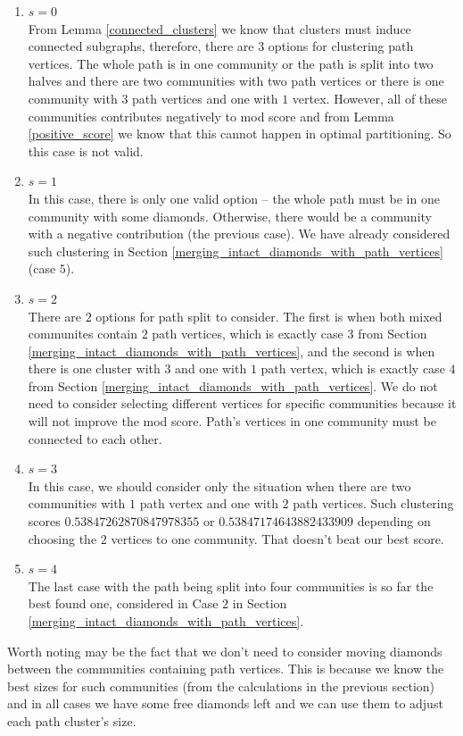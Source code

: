 \documentclass[letterpaper,12pt]{article}
\begin{document}
\begin{enumerate}
      \item $s=0$\\
            From Lemma \ref{connected_clusters} we know that clusters must induce connected subgraphs, therefore, there are $3$ options for clustering path vertices. The whole path is in one community or the path is split into two halves and there are two communities with two path vertices or there is one community with $3$ path vertices and one with $1$ vertex. However, all of these communities contributes negatively to mod score and from Lemma \ref{positive_score} we know that this cannot happen in optimal partitioning. So this case is not valid.\\
      \item $s=1$\\
            In this case, there is only one valid option -- the whole path must be in one community with some diamonds. Otherwise, there would be a community with a negative contribution (the previous case). We have already considered such clustering in Section \ref{merging_intact_diamonds_with_path_vertices} (case $5$).\\
      \item $s=2$\\
            There are $2$ options for path split to consider. The first is when both mixed communites contain $2$ path vertices, which is exactly case $3$ from Section \ref{merging_intact_diamonds_with_path_vertices}, and the second is when there is one cluster with $3$ and one with $1$ path vertex, which is exactly case $4$ from Section \ref{merging_intact_diamonds_with_path_vertices}. We do not need to consider selecting different vertices for specific communities because it will not improve the mod score. Path's vertices in one community must be connected to each other.\\
      \item $s=3$\\
            In this case, we should consider only the situation when there are two communities with $1$ path vertex and one with $2$ path vertices. Such clustering scores $0.53847262870847978355$ or $0.53847174643882433909$ depending on choosing the $2$ vertices to one community. That doesn't beat our best score.\\
      \item $s=4$\\
            The last case with the path being split into four communities is so far the best found one, considered in Case $2$ in Section \ref{merging_intact_diamonds_with_path_vertices}.
\end{enumerate}
Worth noting may be the fact that we don't need to consider moving diamonds between the communities containing path vertices. This is because we know the best sizes for such communities (from the calculations in the previous section) and in all cases we have some free diamonds left and we can use them to adjust each path cluster's size.
\end{document}
